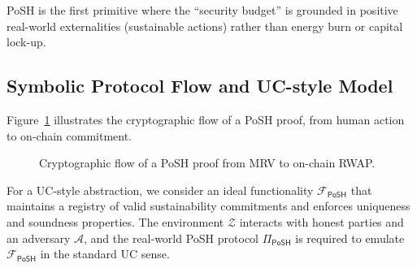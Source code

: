 \documentclass[11pt,a4paper]{report}
\theoremstyle{definition}
\theoremstyle{remark}
\begin{document}
PoSH is the first primitive where the ``security budget'' is grounded in
positive real-world externalities (sustainable actions) rather than energy
burn or capital lock-up.

\subsection{Symbolic Protocol Flow and UC-style Model}

Figure~\ref{fig:posh-crypto-flow} illustrates the cryptographic flow of a PoSH
proof, from human action to on-chain commitment.

\begin{figure}[h!]
  \centering
  \caption{Cryptographic flow of a PoSH proof from MRV to on-chain RWAP.}
  \label{fig:posh-crypto-flow}
\end{figure}

For a UC-style abstraction, we consider an ideal functionality
\(\mathcal{F}_{\textsf{PoSH}}\) that maintains a registry of valid sustainability
commitments and enforces uniqueness and soundness properties. The environment
\(\mathcal{Z}\) interacts with honest parties and an adversary \(\mathcal{A}\),
and the real-world PoSH protocol \(\Pi_{\textsf{PoSH}}\) is required to emulate
\(\mathcal{F}_{\textsf{PoSH}}\) in the standard UC sense.
\end{document}
